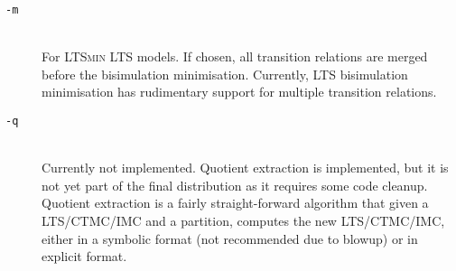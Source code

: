 \begin{description}
\item[\texttt{-m}] \ \\
   For \textsc{LTSmin} LTS models. If chosen, all transition relations are merged before the bisimulation minimisation. Currently, LTS bisimulation minimisation has rudimentary support for multiple transition relations.

\item[\texttt{-q }] \ \\
   Currently not implemented. Quotient extraction is implemented, but it is not yet part of the final distribution as it requires some code cleanup. Quotient extraction is a fairly straight-forward algorithm that given a LTS/CTMC/IMC and a partition, computes the new LTS/CTMC/IMC, either in a symbolic format (not recommended due to blowup) or in explicit format.

\end{description}

